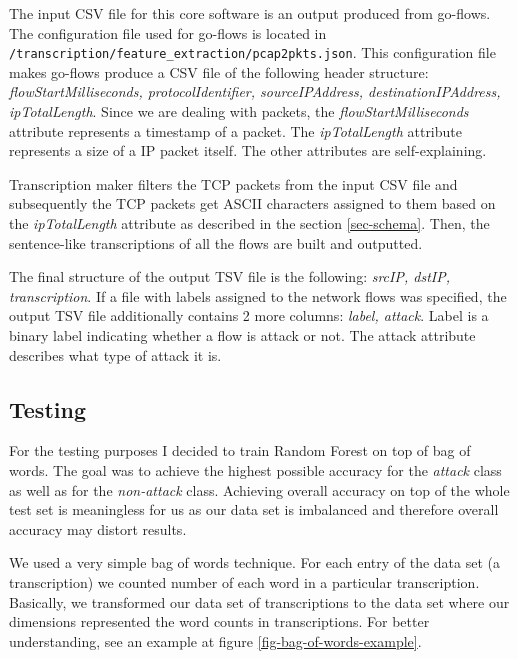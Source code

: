 \documentclass{article}
\begin{document}
The input CSV file for this core software is an output produced from go-flows. The configuration file used for go-flows is located in \verb|/transcription/feature_extraction/pcap2pkts.json|. This configuration file makes go-flows produce a CSV file of the following header structure: \textit{flowStartMilliseconds, protocolIdentifier, sourceIPAddress, destinationIPAddress, ipTotalLength}. Since we are dealing with packets, the \textit{flowStartMilliseconds} attribute represents a timestamp of a packet. The \textit{ipTotalLength} attribute represents a size of a IP packet itself. The other attributes are self-explaining.

Transcription maker filters the TCP packets from the input CSV file and subsequently the TCP packets get ASCII characters assigned to them based on the \textit{ipTotalLength} attribute as described in the section \ref{sec-schema}. Then, the sentence-like transcriptions of all the flows are built and outputted.

The final structure of the output TSV file is the following: \textit{srcIP, dstIP, transcription}. If a file with labels assigned to the network flows was specified, the output TSV file additionally contains 2 more columns: \textit{label, attack}. Label is a binary label indicating whether a flow is attack or not. The attack attribute describes what type of attack it is.


\subsection{Testing}
For the testing purposes I decided to train Random Forest on top of bag of words. The goal was to achieve the highest possible accuracy for the \textit{attack} class as well as for the \textit{non-attack} class. Achieving overall accuracy on top of the whole test set is meaningless for us as our data set is imbalanced and therefore overall accuracy may distort results.

We used a very simple bag of words technique. For each entry of the data set (a transcription) we counted number of each word in a particular transcription. Basically, we transformed our data set of transcriptions to the data set where our dimensions represented the word counts in transcriptions. For better understanding, see an example at figure \ref{fig-bag-of-words-example}.
\end{document}
